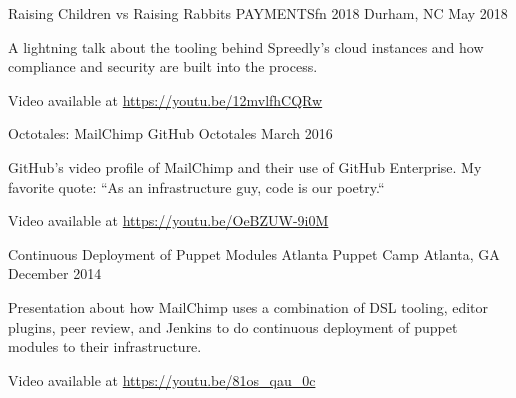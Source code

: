 

\begin{cventries}

  \cventry
    {Raising Children vs Raising Rabbits} %
    {PAYMENTSfn 2018} %
    {Durham, NC} %
    {May 2018} %
    {
      \begin{cvitems} %
        \item {A lightning talk about the tooling behind Spreedly's cloud instances and how compliance and security are built into the process.}
        \item {Video available at \url{https://youtu.be/12mvlfhCQRw}}
      \end{cvitems}
    }

  \cventry
    {Octotales: MailChimp} %
    {GitHub Octotales} %
    {} %
    {March 2016} %
    {
      \begin{cvitems} %
        \item {GitHub's video profile of MailChimp and their use of GitHub Enterprise. My favorite quote: ``As an infrastructure guy, code is our poetry.``}
        \item {Video available at \url{https://youtu.be/OeBZUW-9i0M}}
      \end{cvitems}
    }

  \cventry
    {Continuous Deployment of Puppet Modules} %
    {Atlanta Puppet Camp} %
    {Atlanta, GA} %
    {December 2014} %
    {
      \begin{cvitems} %
        \item {Presentation about how MailChimp uses a combination of DSL tooling, editor plugins, peer review, and Jenkins to do continuous deployment of puppet modules to their infrastructure.}
        \item {Video available at \url{https://youtu.be/81os_qau_0c}}
      \end{cvitems}
    }

\end{cventries}
